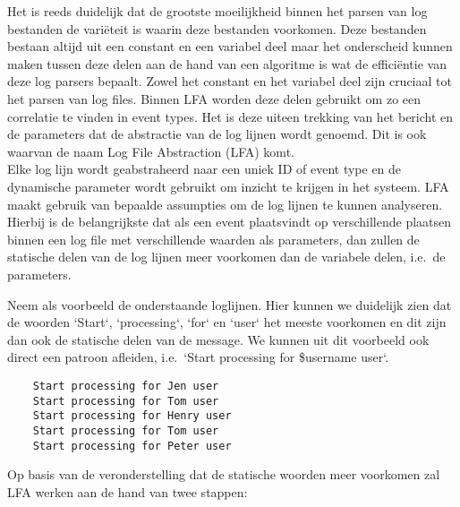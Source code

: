 Het is reeds duidelijk dat de grootste moeilijkheid binnen het parsen van log bestanden de variëteit is waarin deze bestanden voorkomen. Deze bestanden bestaan altijd uit een constant en een variabel deel maar het onderscheid kunnen maken tussen deze delen aan de hand van een algoritme is wat de efficiëntie van deze log parsers bepaalt. Zowel het constant en het variabel deel zijn cruciaal tot het parsen van log files. Binnen LFA worden deze delen gebruikt om zo een correlatie te vinden in event types. Het is deze uiteen trekking van het bericht en de parameters dat de abstractie van de log lijnen wordt genoemd. Dit is ook waarvan de naam Log File Abstraction (LFA) komt.\\

Elke log lijn wordt geabstraheerd naar een uniek ID of event type en de dynamische parameter wordt gebruikt om inzicht te krijgen in het systeem. LFA maakt gebruik van bepaalde assumpties om de log lijnen te kunnen analyseren. Hierbij is de belangrijkste dat als een event plaatsvindt op verschillende plaatsen binnen een log file met verschillende waarden als parameters, dan zullen de statische delen van de log lijnen meer voorkomen dan de variabele delen, i.e.\ de parameters.

Neem als voorbeeld de onderstaande loglijnen. Hier kunnen we duidelijk zien dat de woorden `Start`, `processing`, `for` en `user` het meeste voorkomen en dit zijn dan ook de statische delen van de message. We kunnen uit dit voorbeeld ook direct een patroon afleiden, i.e.\ `Start processing for \$username user`.\\
\begin{verbatim}
    Start processing for Jen user
    Start processing for Tom user
    Start processing for Henry user
    Start processing for Tom user
    Start processing for Peter user
\end{verbatim}

Op basis van de veronderstelling dat de statische woorden meer voorkomen zal LFA werken aan de hand van twee stappen:

